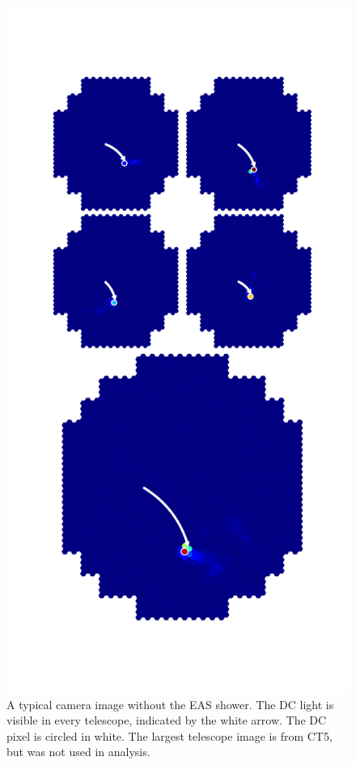 \documentclass[11pt]{article}
\begin{document}
\begin{figure}
\begin{minipage}{0.45\textwidth}
\includegraphics[trim=80 120 80 150,clip,width=\textwidth]{graphDC}
\caption{A typical camera image without the EAS shower. The DC light is visible in every telescope, indicated by the white arrow. The DC pixel is circled in white. The largest telescope image is from CT5, but was not used in analysis.}

\end{minipage}
\end{figure}
\end{document}
